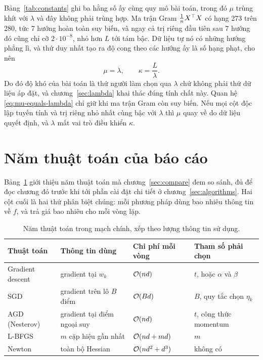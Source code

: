 Bảng~\ref{tab:constants} ghi ba hằng số ấy cùng quy mô bài toán, trong đó $\mu$
trùng khít với $\lambda$ và đây không phải trùng hợp. Ma trận Gram
$\tfrac{1}{n} X^{\top} X$ có hạng 273 trên 280, tức 7 hướng hoàn toàn suy biến, và
ngay cả trị riêng đầu tiên sau 7 hướng đó cũng chỉ cỡ $2 \cdot 10^{-8}$, nhỏ hơn
$L$ tới tám bậc. Dữ liệu tự nó có những hướng phẳng lì, và thứ duy nhất tạo ra độ
cong theo các hướng ấy là số hạng phạt, cho nên
%
\begin{equation}
  \label{eq:mu-equals-lambda}
  \mu = \lambda, \qquad \kappa = \frac{L}{\lambda}.
\end{equation}
%
Do đó độ khó của bài toán là thứ người làm chọn qua $\lambda$ chứ không phải thứ
dữ liệu áp đặt, và chương~\ref{sec:lambda} khai thác đúng tính chất này. Quan hệ
\eqref{eq:mu-equals-lambda} chỉ giữ khi ma trận Gram còn suy biến. Nếu mọi cột
độc lập tuyến tính và trị riêng nhỏ nhất cùng bậc với $\lambda$ thì $\mu$ quay về
do dữ liệu quyết định, và $\lambda$ mất vai trò điều khiển $\kappa$.

\section{Năm thuật toán của báo cáo}
\label{sec:catalogue}

Bảng~\ref{tab:methods} giới thiệu năm thuật toán mà chương~\ref{sec:compare} đem
so sánh, đủ để đọc chương đó trước khi tới phần cài đặt chi tiết ở
chương~\ref{sec:algorithms}. Hai cột cuối là hai thứ phân biệt chúng: mỗi phương
pháp dùng bao nhiêu thông tin về $f$, và trả giá bao nhiêu cho mỗi vòng lặp.

\begin{table}[tp]
  \centering
  \caption{Năm thuật toán trong mạch chính, xếp theo lượng thông tin sử dụng.}
  \label{tab:methods}
  \begin{tabular}{llll}
    \toprule
    Thuật toán & Thông tin dùng & Chi phí mỗi vòng & Tham số phải chọn \\
    \midrule
    Gradient descent & gradient tại $w_k$      & $\mathcal{O}(nd)$        & $t$, hoặc $\alpha$ và $\beta$ \\
    SGD              & gradient trên lô $B$ điểm & $\mathcal{O}(Bd)$      & $B$, quy tắc chọn $\eta_k$ \\
    AGD (Nesterov)   & gradient tại điểm ngoại suy & $\mathcal{O}(nd)$    & $t$, công thức momentum \\
    L-BFGS           & $m$ cặp hiệu gần nhất   & $\mathcal{O}(nd + md)$   & $m$ \\
    Newton           & toàn bộ Hessian         & $\mathcal{O}(nd^{2} + d^{3})$ & không có \\
    \bottomrule
  \end{tabular}
\end{table}

